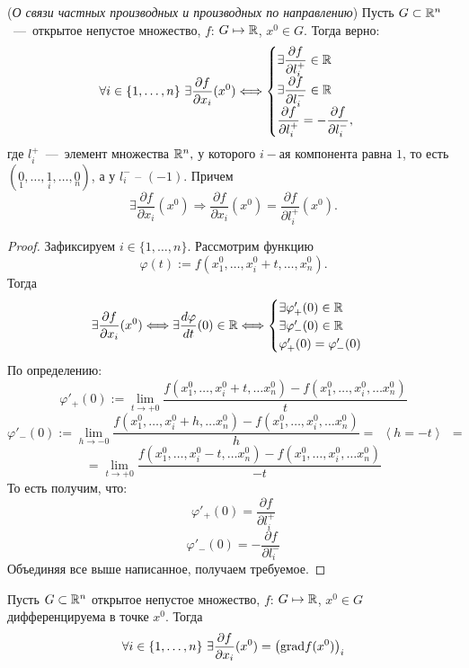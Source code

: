 \lemma (\textit{О связи частных производных и производных по направлению}) Пусть $G \subset \mathbb{R}^{n}$~---~открытое непустое множество, $f$: $G \mapsto \mathbb{R}$, $x^{0} \in G.$ Тогда верно:
$$\forall i \in \{1, \ldots, n\} \ \exists \dfrac{\partial f}{\partial x_i} (x^0) \Longleftrightarrow \begin{cases}
    \exists \dfrac{\partial f}{\partial l_{i}^{+}} \in \mathbb{R} \\
    \exists \dfrac{\partial f}{\partial l_{i}^{-}} \in \mathbb{R} \\
    \dfrac{\partial f}{\partial l_{i}^{+}} = - \dfrac{\partial f}{\partial l_{i}^{-}}, 
\end{cases}$$ где $l_{i}^{+}$~---~элемент множества $\mathbb{R}^{n},$ у которого $i-$ая компонента равна $1$, то есть\\ $(\underset{1}{0}, \ldots, \underset{i}{1}, \ldots, \underset{n}{0})$, а у $l_{i}^{-}$ -- $(-1).$ Причем  
$$\exists \dfrac{\partial f}{\partial x_i} (x^0) \Longrightarrow \dfrac{\partial f}{\partial x_i} (x^0) = \dfrac{\partial f}{\partial l_{i}^{+}} (x^{0}).$$

\begin{proof}
    Зафиксируем $i \in \{1, \ldots, n\}.$ Рассмотрим функцию $$\varphi(t) := f(x_1^0, \ldots, x_i^0 + t, \ldots, x_n^0).$$ Тогда $$\exists \dfrac{\partial f}{\partial x_i} (x^0) \Longleftrightarrow \exists \frac{d\varphi}{dt}(0) \in \mathbb{R} \Longleftrightarrow \begin{cases}
        \exists \varphi'_{+}(0) \in \mathbb{R}\\
        \exists \varphi'_{-}(0) \in \mathbb{R} \\
        \varphi'_{+}(0) = \varphi'_{-}(0)
    \end{cases}$$
    По определению:
    $$\varphi'_{+}(0) := \lim\limits_{t \to +0} \dfrac{f(x_1^0, \ldots, x_i^0 + t, \ldots x_n^0) - f(x_1^0, \ldots, x_i^0, \ldots x_n^0)}{t} $$
    $$\varphi'_{-}(0) := \lim\limits_{h \to -0} \dfrac{f(x_1^0, \ldots, x_i^0 + h, \ldots x_n^0) - f(x_1^0, \ldots, x_i^0, \ldots x_n^0)}{h} = \ \  \left<h = -t \right> \ \  = $$ $$ = \lim\limits_{t \to +0} \dfrac{f(x_1^0, \ldots, x_i^0 - t, \ldots x_n^0) - f(x_1^0, \ldots, x_i^0, \ldots x_n^0)}{-t}$$
    То есть получим, что:
    $$\varphi'_{+}(0) = \dfrac{\partial f}{\partial l_{i}^{+}}$$
    $$\varphi'_{-}(0) = - \dfrac{\partial f}{\partial l_{i}^{-}}$$
    Объединяя все выше написанное, получаем требуемое.
\end{proof}


\begin{theorem}
    Пусть $G \subset \mathbb{R}^{n}$ открытое непустое множество, $f$: $G \mapsto \mathbb{R}$, $x^{0} \in G$ дифференцируема в точке $x^0$. Тогда 
    $$\forall i \in \{1, \ldots, n\} \ \exists \dfrac{\partial f}{\partial x_i} (x^0) = \left( \textup{grad} f(x^0) \right)_i$$
\end{theorem}

